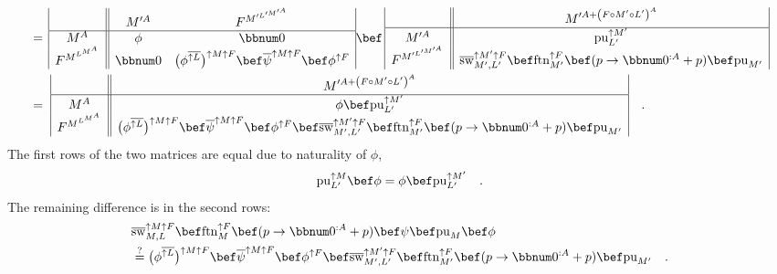 \begin{align*}
 & =\,\begin{array}{|c||cc|}
 & M^{\prime A} & F^{M^{\prime L^{\prime M^{\prime A}}}}\\
\hline M^{A} & \phi & \bbnum 0\\
F^{M^{L^{M^{A}}}} & \bbnum 0 & \big(\phi^{\overline{\uparrow L}}\big)^{\uparrow M\uparrow F}\bef\overline{\psi}^{\uparrow M\uparrow F}\bef\phi^{\uparrow F}
\end{array}\bef\,\begin{array}{|c||c|}
 & M^{\prime A+\left(F\circ M^{\prime}\circ L^{\prime}\right)^{A}}\\
\hline M^{\prime A} & \text{pu}_{L^{\prime}}^{\uparrow M^{\prime}}\\
F^{M^{\prime L^{\prime M^{\prime A}}}} & \overline{\text{sw}}_{M^{\prime},L^{\prime}}^{\uparrow M^{\prime}\uparrow F}\bef\text{ftn}_{M^{\prime}}^{\uparrow F}\bef(p\rightarrow\bbnum 0^{:A}+p)\bef\text{pu}_{M^{\prime}}
\end{array}\\
 & =\,\,\begin{array}{|c||c|}
 & M^{\prime A+\left(F\circ M^{\prime}\circ L^{\prime}\right)^{A}}\\
\hline M^{A} & \phi\bef\text{pu}_{L^{\prime}}^{\uparrow M^{\prime}}\\
F^{M^{L^{M^{A}}}} & \big(\phi^{\overline{\uparrow L}}\big)^{\uparrow M\uparrow F}\bef\overline{\psi}^{\uparrow M\uparrow F}\bef\phi^{\uparrow F}\bef\overline{\text{sw}}_{M^{\prime},L^{\prime}}^{\uparrow M^{\prime}\uparrow F}\bef\text{ftn}_{M^{\prime}}^{\uparrow F}\bef(p\rightarrow\bbnum 0^{:A}+p)\bef\text{pu}_{M^{\prime}}
\end{array}\quad.
\end{align*}
The first rows of the two matrices are equal due to naturality of
$\phi$,
\[
\text{pu}_{L^{\prime}}^{\uparrow M}\bef\phi=\phi\bef\text{pu}_{L^{\prime}}^{\uparrow M^{\prime}}\quad.
\]
The remaining difference is in the second rows:
\begin{align}
 & \overline{\text{sw}}_{M,L}^{\uparrow M\uparrow F}\bef\text{ftn}_{M}^{\uparrow F}\bef(p\rightarrow\bbnum 0^{:A}+p)\bef\psi\bef\text{pu}_{M}\bef\phi\nonumber \\
 & \overset{?}{=}\big(\phi^{\overline{\uparrow L}}\big)^{\uparrow M\uparrow F}\bef\overline{\psi}^{\uparrow M\uparrow F}\bef\phi^{\uparrow F}\bef\overline{\text{sw}}_{M^{\prime},L^{\prime}}^{\uparrow M^{\prime}\uparrow F}\bef\text{ftn}_{M^{\prime}}^{\uparrow F}\bef(p\rightarrow\bbnum 0^{:A}+p)\bef\text{pu}_{M^{\prime}}\quad.\label{eq:monadic-naturality-swap-free-monad-derivation1}
\end{align}

